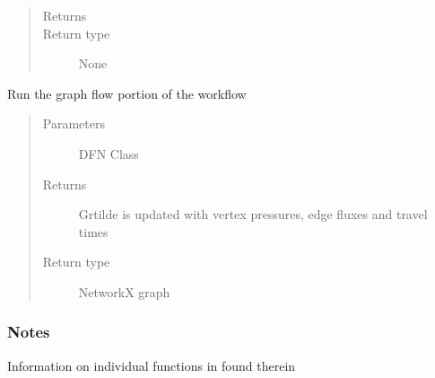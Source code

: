 \documentclass[letterpaper,10pt,english]{sphinxmanual}
\begin{document}
\begin{fulllineitems}
\begin{fulllineitems}
\begin{quote}
\begin{description}
\item[{Returns}] \leavevmode


\item[{Return type}] \leavevmode
None

\end{description}\end{quote}

\end{fulllineitems}


\begin{fulllineitems}
\label{\detokenize{pydfnworks:pydfnworks.general.dfnworks.DFNWORKS.run_graph_flow}}
Run the graph flow portion of the workflow
\begin{quote}\begin{description}
\item[{Parameters}] \leavevmode
{} \textendash{} DFN Class

\item[{Returns}] \leavevmode
{} \textendash{} Grtilde is updated with vertex pressures, edge fluxes and travel times

\item[{Return type}] \leavevmode
NetworkX graph

\end{description}\end{quote}
\subsubsection*{Notes}

Information on individual functions in found therein

\end{fulllineitems}



\end{fulllineitems}
\end{document}
